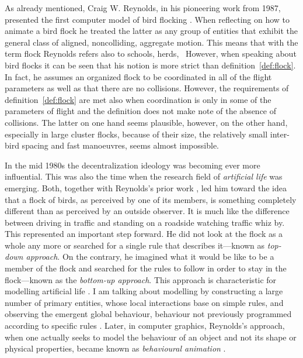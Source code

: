 As already mentioned, Craig W. Reynolds, in his pioneering work from 1987, presented the first computer model of bird flocking \cite{reynolds:1987}. When reflecting on how to animate a bird flock he treated the latter as any group of entities that exhibit the general class of aligned, noncolliding, aggregate motion. This means that with the term flock Reynolds refers also to schools, herds, \etc\ However, when speaking about bird flocks it can be seen that his notion is more strict than definition~\ref{def:flock}. In fact, he assumes an organized flock to be coordinated in all of the flight parameters as well as that there are no collisions. However, the requirements of definition~\ref{def:flock} are met also when coordination is only in some of the parameters of flight and the definition does not make note of the absence of collisions. The latter on one hand seems plausible, however, on the other hand, especially in large cluster flocks, because of their size, the relatively small inter-bird spacing and fast manoeuvres, seems almost impossible.

In the mid 1980s the decentralization ideology \cite{resnick:1997} was becoming ever more influential. This was also the time when the research field of \emph{artificial life} \cite{adami:1998,emmenche:1994,langton:1989} was emerging. Both, together with Reynolds's prior work \cite{reynolds:1978,reynolds:1982}, led him toward the idea that a flock of birds, as perceived by one of its members, is something completely different than as perceived by an outside observer. It is much like the difference between driving in traffic and standing on a roadside watching traffic whiz by. This represented an important step forward. He did not look at the flock as a whole any more or searched for a single rule that describes it---known as \emph{top-down approach}. On the contrary, he imagined what it would be like to be a member of the flock and searched for the rules to follow in order to stay in the flock---known as the \emph{bottom-up approach}. This approach is characteristic for modelling artificial life \cite{adami:1998,emmenche:1994,gardner:1970,langton:1984,langton:1989,rucker:1993,terzopoulos:1994,terzopoulos:1999,tu:1999,ward:2001}. I am talking about modelling by constructing a large number of primary entities, whose local interactions base on simple rules, and observing the emergent global behaviour, behaviour not previously programmed according to specific rules \cite{emmenche:1994}. Later, in computer graphics, Reynolds's approach, when one actually seeks to model the behaviour of an object and not its shape or physical properties,  became known as \emph{behavioural animation} \cite{reynolds:1987}.

